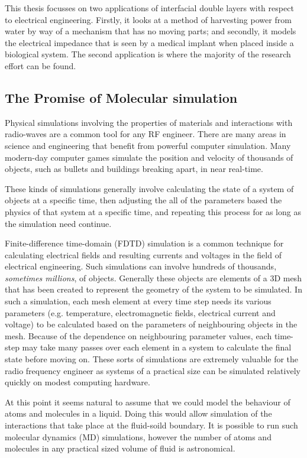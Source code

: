 This thesis focusses on two applications of interfacial double layers with respect to electrical engineering. Firstly, it looks at a method of harvesting power from water by way of a mechanism that has no moving parts; and secondly, it models the electrical impedance that is seen by a medical implant when placed inside a biological system. The second application is where the majority of the research effort can be found.

\subsection{The Promise of Molecular simulation}
Physical simulations involving the properties of materials and interactions with radio-waves are a common tool for any RF engineer. There are many areas in science and engineering that benefit from powerful computer simulation. Many modern-day computer games simulate the position and velocity of thousands of objects, such as bullets and buildings breaking apart, in near real-time.

These kinds of simulations generally involve calculating the state of a system of objects at a specific time, then adjusting the all of the parameters based the physics of that system at a specific time, and repeating this process for as long as the simulation need continue.

Finite-difference time-domain (FDTD) simulation is a common technique for calculating electrical fields and resulting currents and voltages in the field of electrical engineering. Such simulations can involve hundreds of thousands, \emph{sometimes millions}, of objects. Generally these objects are elements of a 3D mesh that has been created to represent the geometry of the system to be simulated. In such a simulation, each mesh element at every time step needs its various parameters (e.g. temperature, electromagnetic fields, electrical current and voltage) to be calculated based on the parameters of neighbouring objects in the mesh. Because of the dependence on neighbouring parameter values, each time-step may take many passes over each element in a system to calculate the final state before moving on. These sorts of simulations are extremely valuable for the radio frequency engineer as systems of a practical size can be simulated relatively quickly on modest computing hardware.

At this point it seems natural to assume that we could model the behaviour of atoms and molecules in a liquid. Doing this would allow simulation of the interactions that take place at the fluid-soild boundary. It is possible to run such molecular dynamics (MD) simulations, however the number of atoms and molecules in any practical sized volume of fluid is astronomical.

